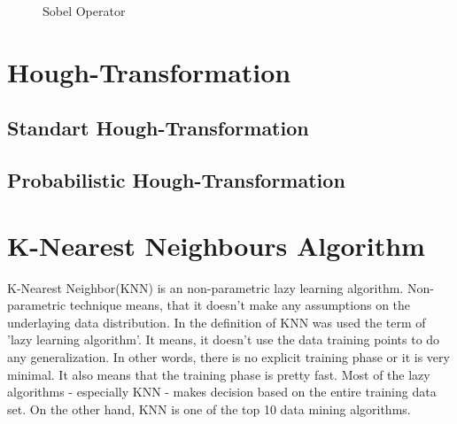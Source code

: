 \begin{figure}[H]
  \centering
  \hfill
  \caption{Sobel Operator\cite{Sobel_Operator}}
\end{figure}




%
\section{Hough-Transformation}\label{sec:Hough-Transformation}
%

%
\subsection{Standart Hough-Transformation}\label{sec:Standart Hough - Transformation}
%


%
\subsection{Probabilistic Hough-Transformation}\label{sec:Probabilistic Hough-Transformation}
%




%
\section{K-Nearest Neighbours Algorithm}\label{sec:K-Nearest Neighbors Algorithm}
%
K-Nearest Neighbor(KNN) is an non-parametric lazy learning algorithm. Non-parametric technique means, that it doesn't make any assumptions on the underlaying data distribution. In the definition of KNN was used the term of 'lazy learning algorithm'. It means, it doesn't use the data training points to do any generalization. In other words, there is no explicit training phase or it is very minimal.  It also means that the training phase is pretty fast. Most of the lazy algorithms - especially KNN - makes decision based on the entire training data set. On the other hand, KNN is one of the top 10 data mining algorithms\cite{k_nearest_neighbours}. 

